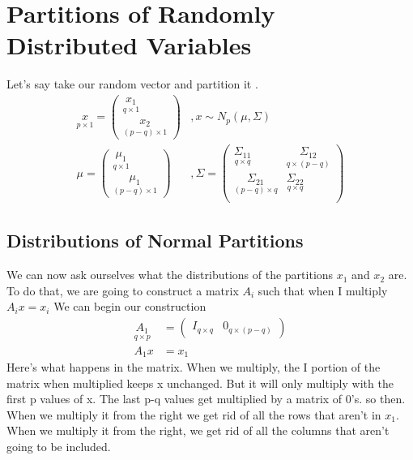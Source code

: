 \section{Partitions of Randomly Distributed Variables}
Let's say take our random vector and partition it .
\begin{align*}
    \underset{p\times 1}{x} = \begin{pmatrix}
    \underset{q\times 1}{x_1}\\
    \underset{(p-q)\times 1}{x_2}
    \end{pmatrix}&,x\sim N_p(\mu,\Sigma)\\
    \mu = \begin{pmatrix}
    \underset{q\times 1}{\mu_1}\\
    \underset{(p-q)\times 1}{\mu_1}
    \end{pmatrix}&,\Sigma = \begin{pmatrix}
    \underset{q \times q}{\Sigma_{11}} & \underset{q \times (p-q)}{\Sigma_{12}}\\
    \underset{(p-q) \times q}{\Sigma_{21}} & \underset{q \times q}{\Sigma_{22}}\\
    \end{pmatrix}
\end{align*}

\subsection{Distributions of Normal Partitions}
We can now ask ourselves what the distributions of the partitions $x_1$ and $x_2$ are. To do that, we are going to construct a matrix $A_i$ such that when I multiply $A_ix =x_i$
We can begin our construction
\begin{align*}
    \underset{q\times p}{A_1} &= \begin{pmatrix}
    I_{q\times q} & 0_{q\times (p-q)}
    \end{pmatrix} \\
    A_1x &= x_1
\end{align*}
Here's what happens in the matrix. When we multiply, the I portion of the matrix when multiplied keeps x unchanged. But it will only multiply with the first p values of x. The last p-q values get multiplied by a matrix of 0's. so then. When we multiply it from the right we get rid of all the rows that aren't in $x_1$. When we multiply it from the right, we get rid of all the columns that aren't going to be included.

